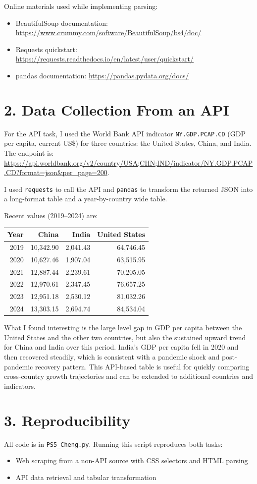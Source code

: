 \documentclass[11pt]{article}
\begin{document}
Online materials used while implementing parsing:
\begin{itemize}
\item BeautifulSoup documentation: \url{https://www.crummy.com/software/BeautifulSoup/bs4/doc/}
\item Requests quickstart: \url{https://requests.readthedocs.io/en/latest/user/quickstart/}
\item pandas documentation: \url{https://pandas.pydata.org/docs/}
\end{itemize}

\section*{2. Data Collection From an API}
For the API task, I used the World Bank API indicator \texttt{NY.GDP.PCAP.CD} (GDP per capita, current US\$) for three countries: the United States, China, and India.
The endpoint is:
\url{https://api.worldbank.org/v2/country/USA;CHN;IND/indicator/NY.GDP.PCAP.CD?format=json&per_page=200}.

I used \texttt{requests} to call the API and \texttt{pandas} to transform the returned JSON into a long-format table and a year-by-country wide table.

Recent values (2019--2024) are:

\begin{center}
\begin{tabular}{rrrr}
\toprule
Year & China & India & United States \\
\midrule
2019 & 10,342.90 & 2,041.43 & 64,746.45 \\
2020 & 10,627.46 & 1,907.04 & 63,515.95 \\
2021 & 12,887.44 & 2,239.61 & 70,205.05 \\
2022 & 12,970.61 & 2,347.45 & 76,657.25 \\
2023 & 12,951.18 & 2,530.12 & 81,032.26 \\
2024 & 13,303.15 & 2,694.74 & 84,534.04 \\
\bottomrule
\end{tabular}
\end{center}

What I found interesting is the large level gap in GDP per capita between the United States and the other two countries, but also the sustained upward trend for China and India over this period.
India's GDP per capita fell in 2020 and then recovered steadily, which is consistent with a pandemic shock and post-pandemic recovery pattern.
This API-based table is useful for quickly comparing cross-country growth trajectories and can be extended to additional countries and indicators.

\section*{3. Reproducibility}
All code is in \texttt{PS5\_Cheng.py}. Running this script reproduces both tasks:
\begin{itemize}
\item Web scraping from a non-API source with CSS selectors and HTML parsing
\item API data retrieval and tabular transformation
\end{itemize}
\end{document}
